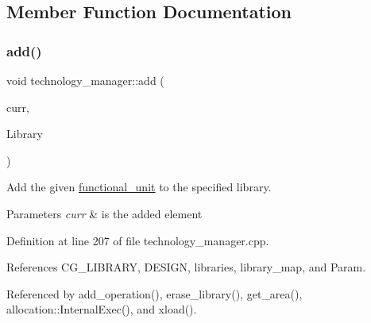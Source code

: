 \subsection{Member Function Documentation}
\mbox{\label{classtechnology__manager_aab46c03c87a27bec53894e1d3ae9b97b}} 
\subsubsection{\texorpdfstring{add()}{add()}}
{\footnotesize\ttfamily void technology\+\_\+manager\+::add (\begin{DoxyParamCaption}\item[{const \hyperlink{technology__node_8hpp_a33dd193b7bd6b987bf0d8a770a819fa7}{technology\+\_\+node\+Ref}}]{curr,  }\item[{const std\+::string \&}]{Library }\end{DoxyParamCaption})}



Add the given \hyperlink{structfunctional__unit}{functional\+\_\+unit} to the specified library. 


\begin{DoxyParams}{Parameters}
{\em curr} & is the added element \\
\hline
\end{DoxyParams}


Definition at line 207 of file technology\+\_\+manager.\+cpp.



References C\+G\+\_\+\+L\+I\+B\+R\+A\+RY, D\+E\+S\+I\+GN, libraries, library\+\_\+map, and Param.



Referenced by add\+\_\+operation(), erase\+\_\+library(), get\+\_\+area(), allocation\+::\+Internal\+Exec(), and xload().

